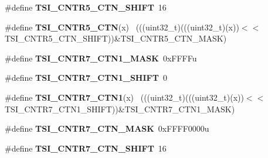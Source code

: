 \begin{DoxyCompactItemize}
\item 
\hypertarget{group___t_s_i___register___masks_ga2de11a65c7ac3cdaa665a69652b26638}{}\#define {\bfseries T\+S\+I\+\_\+\+C\+N\+T\+R5\+\_\+\+C\+T\+N\+\_\+\+S\+H\+I\+F\+T}~16\label{group___t_s_i___register___masks_ga2de11a65c7ac3cdaa665a69652b26638}

\item 
\hypertarget{group___t_s_i___register___masks_gae9d2366ee549d24dd790fc999fe7b1bf}{}\#define {\bfseries T\+S\+I\+\_\+\+C\+N\+T\+R5\+\_\+\+C\+T\+N}(x)                                              ~(((uint32\+\_\+t)(((uint32\+\_\+t)(x))$<$$<$T\+S\+I\+\_\+\+C\+N\+T\+R5\+\_\+\+C\+T\+N\+\_\+\+S\+H\+I\+F\+T))\&T\+S\+I\+\_\+\+C\+N\+T\+R5\+\_\+\+C\+T\+N\+\_\+\+M\+A\+S\+K)\label{group___t_s_i___register___masks_gae9d2366ee549d24dd790fc999fe7b1bf}

\item 
\hypertarget{group___t_s_i___register___masks_ga9c4634bb590facebde26807fec2d1d3e}{}\#define {\bfseries T\+S\+I\+\_\+\+C\+N\+T\+R7\+\_\+\+C\+T\+N1\+\_\+\+M\+A\+S\+K}~0x\+F\+F\+F\+Fu\label{group___t_s_i___register___masks_ga9c4634bb590facebde26807fec2d1d3e}

\item 
\hypertarget{group___t_s_i___register___masks_ga309db3212bb128582d3368796ed78ca7}{}\#define {\bfseries T\+S\+I\+\_\+\+C\+N\+T\+R7\+\_\+\+C\+T\+N1\+\_\+\+S\+H\+I\+F\+T}~0\label{group___t_s_i___register___masks_ga309db3212bb128582d3368796ed78ca7}

\item 
\hypertarget{group___t_s_i___register___masks_ga23e75e19bdb0b0984d30f04bf92f667c}{}\#define {\bfseries T\+S\+I\+\_\+\+C\+N\+T\+R7\+\_\+\+C\+T\+N1}(x)                                            ~(((uint32\+\_\+t)(((uint32\+\_\+t)(x))$<$$<$T\+S\+I\+\_\+\+C\+N\+T\+R7\+\_\+\+C\+T\+N1\+\_\+\+S\+H\+I\+F\+T))\&T\+S\+I\+\_\+\+C\+N\+T\+R7\+\_\+\+C\+T\+N1\+\_\+\+M\+A\+S\+K)\label{group___t_s_i___register___masks_ga23e75e19bdb0b0984d30f04bf92f667c}

\item 
\hypertarget{group___t_s_i___register___masks_ga7c33a7d7230526987b061c3213315f8f}{}\#define {\bfseries T\+S\+I\+\_\+\+C\+N\+T\+R7\+\_\+\+C\+T\+N\+\_\+\+M\+A\+S\+K}~0x\+F\+F\+F\+F0000u\label{group___t_s_i___register___masks_ga7c33a7d7230526987b061c3213315f8f}

\item 
\hypertarget{group___t_s_i___register___masks_ga3601612f76d15ea71289beb7dc2c5336}{}\#define {\bfseries T\+S\+I\+\_\+\+C\+N\+T\+R7\+\_\+\+C\+T\+N\+\_\+\+S\+H\+I\+F\+T}~16\label{group___t_s_i___register___masks_ga3601612f76d15ea71289beb7dc2c5336}


\end{DoxyCompactItemize}
